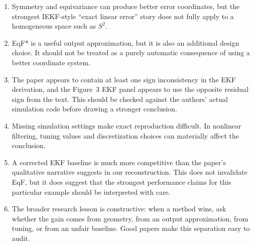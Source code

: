 \documentclass[11pt]{article}
\begin{document}
\begin{enumerate}
    \item Symmetry and equivariance can produce better error coordinates, but
    the strongest IEKF-style ``exact linear error'' story does not fully apply
    to a homogeneous space such as \(S^2\).

    \item EqF* is a useful output approximation, but it is also an additional
    design choice.  It should not be treated as a purely automatic consequence
    of using a better coordinate system.

    \item The paper appears to contain at least one sign inconsistency in the
    EKF derivation, and the Figure~3 EKF panel appears to use the opposite
    residual sign from the text.  This should be checked against the authors'
    actual simulation code before drawing a stronger conclusion.

    \item Missing simulation settings make exact reproduction difficult.
    In nonlinear filtering, tuning values and discretization choices can
    materially affect the conclusion.

    \item A corrected EKF baseline is much more competitive than the paper's
    qualitative narrative suggests in our reconstruction.  This does not
    invalidate EqF, but it does suggest that the strongest performance claims
    for this particular example should be interpreted with care.

    \item The broader research lesson is constructive: when a method wins, ask
    whether the gain comes from geometry, from an output approximation, from
    tuning, or from an unfair baseline.  Good papers make this separation easy
    to audit.
\end{enumerate}
\end{document}

